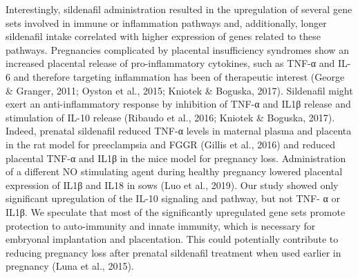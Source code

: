 \documentclass[authordate, empirical,issue]{jote-new-article}
\begin{document}
Interestingly, sildenafil administration resulted in the upregulation of several gene sets involved in immune or inflammation pathways and, additionally, longer sildenafil intake correlated with higher expression of genes related to these pathways. Pregnancies complicated by placental insufficiency syndromes show an increased placental release of pro-inflammatory cytokines, such as TNF-α and IL-6 and therefore targeting inflammation has been of therapeutic interest (George \& Granger, 2011; Oyston et al., 2015; Kniotek \& Boguska, 2017). Sildenafil might exert an anti-inflammatory response by inhibition of TNF-α and IL1β release and stimulation of IL-10 release (Ribaudo et al., 2016; Kniotek \& Boguska, 2017). Indeed, prenatal sildenafil reduced TNF-α levels in maternal plasma and placenta in the rat model for preeclampsia and FGGR (Gillis et al., 2016) and reduced placental TNF-α and IL1β in the mice model for pregnancy loss. Administration of a different NO stimulating agent during healthy pregnancy lowered placental expression of IL1β and IL18 in sows (Luo et al., 2019). Our study showed only significant upregulation of the IL-10 signaling and pathway, but not TNF- α or IL1β. We speculate that most of the significantly upregulated gene sets promote protection to auto-immunity and innate immunity, which is necessary for embryonal implantation and placentation. This could potentially contribute to reducing pregnancy loss after prenatal sildenafil treatment when used earlier in pregnancy (Luna et al., 2015).
\end{document}
